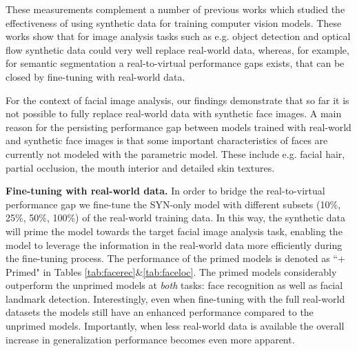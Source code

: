 \documentclass[10pt,twocolumn,letterpaper]{article}
\begin{document}
	These measurements complement a number of previous works which studied the effectiveness of using synthetic data for training computer vision models. These works show that for image analysis tasks such as e.g. object detection \cite{gupta2014learning} and optical flow \cite{butler2012naturalistic} synthetic data could very well replace real-world data, whereas, for example, for semantic segmentation \cite{mccormac2017scenenet} a real-to-virtual performance gaps exists, that can be closed by fine-tuning with real-world data. 
	
	For the context of facial image analysis, our findings demonstrate that so far it is not possible to fully replace real-world data with synthetic face images. A main reason for the persisting performance gap between models trained with real-world and synthetic face images is that some important characteristics of faces are currently not modeled with the parametric model. These include e.g. facial hair, partial occlusion, the mouth interior and detailed skin textures.	

\textbf{Fine-tuning with real-world data.} In order to bridge the real-to-virtual performance gap we fine-tune the SYN-only model with different subsets (10\%, 25\%, 50\%, 100\%) of the real-world training data. In this way, the synthetic data will prime the model towards the target facial image analysis task, enabling the model to leverage the information in the real-world data more efficiently during the fine-tuning process. The performance of the primed models is denoted as ``+ Primed" in Tables \ref{tab:facerec}\&\ref{tab:faceloc}.	The primed models considerably outperform the unprimed models at \textit{both} tasks: face recognition as well as facial landmark detection. Interestingly, even when fine-tuning with the full real-world datasets the models still have an enhanced performance compared to the unprimed models. Importantly, when less real-world data is available the overall increase in generalization performance becomes even more apparent.
       
\end{document}
